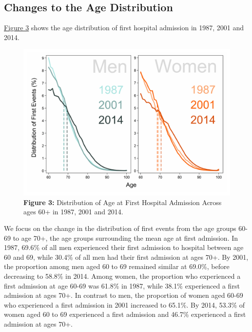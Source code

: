 \subsection{Changes to the Age Distribution}

\hyperref[ch4:fig3]{Figure 3} shows the age distribution of first hospital 
admission in 1987, 2001 and 2014.

	\begin{figure}[H]
		\centering
		\includegraphics[scale=0.475]{Paper_3/Figure_3.pdf}
		\caption*{\textbf{Figure 3:} 	Distribution of Age at First Hospital 
										Admission Across ages 60+ in 1987, 2001 and 2014.}
	\label{ch4:fig3}
	\end{figure}

We focus on the change in the distribution of first events 
from the age groups 60-69 to age 70+, the age groups surrounding the mean 
age at first admission. In 1987, 69.6\% of all men experienced their first 
admission to hospital between age 60 and 69, while 30.4\% of all men had 
their first admission at ages 70+. By 2001, the proportion among men aged 
60 to 69 remained similar at 69.0\%, before decreasing to 58.8\% in 2014. 
Among women, the proportion who experienced a first admission at age 60-69 
was 61.8\% in 1987, while 38.1\% experienced a first admission at ages 70+. 
In contrast to men, the proportion of women aged 60-69 who experienced a 
first admission in 2001 increased to 65.1\%. By 2014, 53.3\% of women aged 
60 to 69 experienced a first admission and 46.7\% experienced a first admission 
at ages 70+.\\

